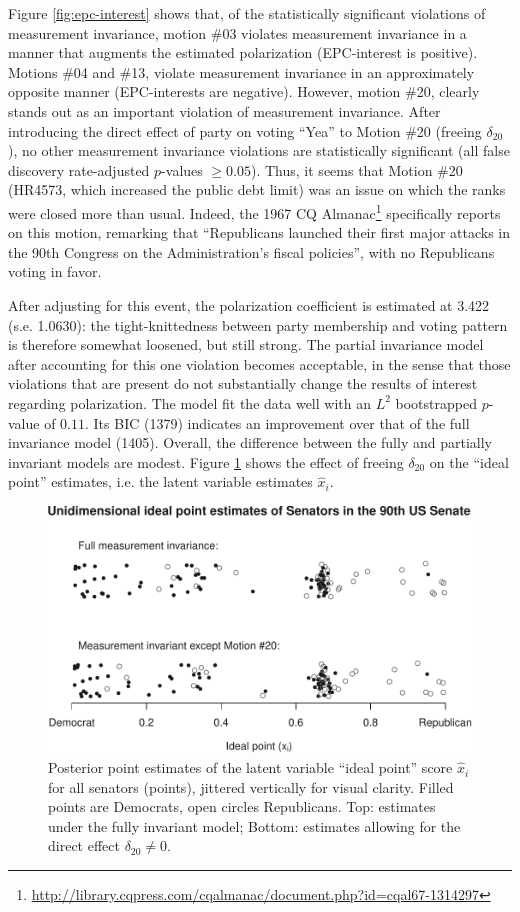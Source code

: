 \documentclass[letterpaper,12pt]{article}
\begin{document}
Figure \ref{fig:epc-interest} shows that, of the statistically significant violations of measurement invariance, motion \#03 violates measurement invariance in a manner that augments the estimated polarization (EPC-interest is positive). Motions \#04 and \#13, violate measurement invariance in an approximately opposite manner (EPC-interests are negative). However, motion \#20, clearly stands out as an important violation of measurement invariance.
After introducing the direct effect of party on voting ``Yea'' to Motion \#20 (freeing $\delta_{20}$), no other measurement invariance violations are statistically significant (all false discovery rate-adjusted $p$-values $\geq 0.05$). Thus, it seems that Motion \#20 (HR4573, which increased the public debt limit) was an issue on which the ranks were closed more than usual. Indeed, the 1967 CQ Almanac\footnote{\url{http://library.cqpress.com/cqalmanac/document.php?id=cqal67-1314297}} specifically reports on this motion, remarking that ``Republicans launched their first major attacks in the 90th Congress on the Administration's fiscal policies'', with no Republicans voting in favor. 

After adjusting for this event, the polarization coefficient is estimated at 3.422 (s.e. 1.0630): the tight-knittedness between party membership and voting pattern is therefore somewhat loosened, but still strong.  The partial invariance model after accounting for this one violation becomes acceptable, in  the sense that those violations that are present do not substantially change the results of interest regarding polarization. The model fit the data well with an $L^2$ bootstrapped $p$-value of $0.11$. Its BIC (1379) indicates an improvement over that of the full invariance model (1405).  Overall, the difference between the fully and partially invariant models are modest. Figure \ref{fig:ideal-points} shows the effect of freeing $\delta_{20}$ on the ``ideal point'' estimates, i.e. the latent variable estimates $\hat{x}_i$. 

\begin{figure}\centering
\includegraphics[width=.85\textwidth]{ideal-points.pdf}
\caption{Posterior point estimates of the latent variable ``ideal point'' score $\hat{x}_i$ for all senators (points), jittered vertically for visual clarity. Filled points are Democrats, open circles Republicans. Top: estimates under the fully invariant model; Bottom: estimates allowing for the direct effect $\delta_{20}\neq0$.}
\label{fig:ideal-points}
\end{figure}
\end{document}
